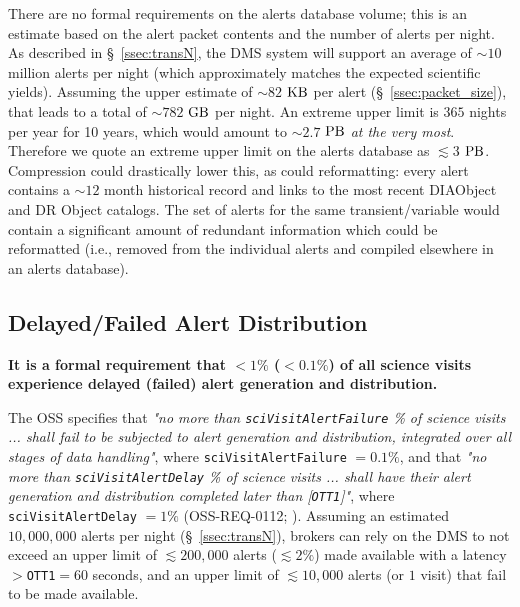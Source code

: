 \documentclass[DM,authoryear,toc]{lsstdoc}
\begin{document}
There are no formal requirements on the alerts database volume; this is an estimate based on the alert packet contents and the number of alerts per night. As described in \S~\ref{ssec:transN}, the DMS system will support an average of $\sim10$ million alerts per night (which approximately matches the expected scientific yields). Assuming the upper estimate of $\sim82$ $\rm KB$ per alert (\S~\ref{ssec:packet_size}), that leads to a total of $\sim782$ $\rm GB$ per night. An extreme upper limit is $365$ nights per year for 10 years, which would amount to $\sim2.7$ $\rm PB$ {\it at the very most}. Therefore we quote an extreme upper limit on the alerts database as $\lesssim3$ $\rm PB$. Compression could drastically lower this, as could reformatting: every alert contains a $\sim12$ month historical record and links to the most recent DIAObject and DR Object catalogs. The set of alerts for the same transient/variable would contain a significant amount of redundant information which could be reformatted (i.e., removed from the individual alerts and compiled elsewhere in an alerts database). 


\subsection{Delayed/Failed Alert Distribution}\label{ssec:OTR1}

{\bf It is a formal requirement that $<1\%$ ($<0.1\%$) of all science visits experience delayed (failed) alert generation and distribution.}

The OSS specifies that {\it "no more than {\tt sciVisitAlertFailure} \% of science visits ... shall fail to be subjected to alert generation and distribution, integrated over all stages of data handling"}, where {\tt sciVisitAlertFailure} $=0.1\%$, and that {\it "no more than {\tt sciVisitAlertDelay} \% of science visits ... shall have their alert generation and distribution completed later than [{\tt OTT1}]"}, where {\tt sciVisitAlertDelay} $=1\%$ (OSS-REQ-0112; ). 
Assuming an estimated $10,000,000$ alerts per night (\S~\ref{ssec:transN}), brokers can rely on the DMS to not exceed an upper limit of $\lesssim 200,000$ alerts ($\lesssim 2\%$) made available with a latency $>${\tt OTT1}$=60$ seconds, and an upper limit of $\lesssim 10,000$ alerts (or $1$ visit) that fail to be made available.
\end{document}
